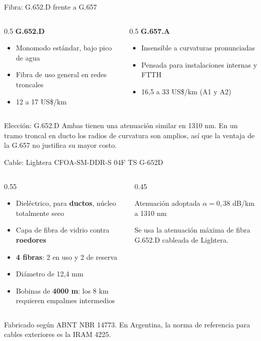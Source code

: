 \documentclass[aspectratio=1610]{beamer}
\begin{document}
\begin{frame}{Fibra: G.652.D frente a G.657}
  \begin{columns}[T]
    \begin{column}{0.5\textwidth}
      \textbf{G.652.D}
      \begin{itemize}
        \item Monomodo estándar, bajo pico de agua
        \item Fibra de uso general en redes troncales
        \item 12 a 17 US\$/km
      \end{itemize}
    \end{column}
    \begin{column}{0.5\textwidth}
      \textbf{G.657.A}
      \begin{itemize}
        \item Insensible a curvaturas pronunciadas
        \item Pensada para instalaciones internas y FTTH
        \item 16,5 a 33 US\$/km (A1 y A2)
      \end{itemize}
    \end{column}
  \end{columns}
  \vspace{0.4cm}
  \begin{block}{Elección: G.652.D}
    Ambas tienen una atenuación similar en 1310 nm. En un tramo troncal en ducto los radios de curvatura son amplios, así que la ventaja de la G.657 no justifica su mayor costo.
  \end{block}
\end{frame}

\begin{frame}{Cable: Lightera CFOA-SM-DDR-S 04F TS G-652D}
  \begin{columns}[T]
    \begin{column}{0.55\textwidth}
      \begin{itemize}
        \item Dieléctrico, para \textbf{ductos}, núcleo totalmente seco
        \item Capa de fibra de vidrio contra \textbf{roedores}
        \item \textbf{4 fibras}: 2 en uso y 2 de reserva
        \item Diámetro de 12,4 mm
        \item Bobinas de \textbf{4000 m}: los 8 km requieren empalmes intermedios
      \end{itemize}
    \end{column}
    \begin{column}{0.45\textwidth}
      \begin{block}{Atenuación adoptada}
        \centering
        $\alpha = 0{,}38$ dB/km a 1310 nm
      \end{block}
      \small
      Se usa la atenuación máxima de fibra G.652.D cableada de Lightera.
    \end{column}
  \end{columns}
  \vspace{0.3cm}
  \small Fabricado según ABNT NBR 14773. En Argentina, la norma de referencia para cables exteriores es la IRAM 4225.
\end{frame}
\end{document}
